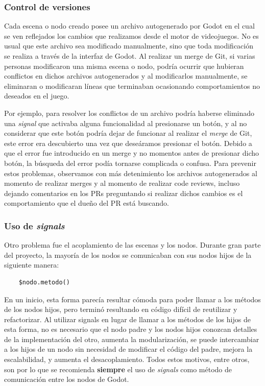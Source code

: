 \subsubsection{Control de versiones}

\noindent Cada escena o nodo creado posee 
un archivo autogenerado por Godot en el cual se ven reflejados los cambios que realizamos desde 
el motor de videojuegos. No es usual que este archivo sea modificado manualmente, sino que toda 
modificación se realiza a través de la interfaz de Godot. Al realizar un merge de Git, si 
varias personas modificaron una misma escena o nodo, podría ocurrir que hubieran conflictos en 
dichos archivos autogenerados y al modificarlos manualmente, se eliminaran o modificaran líneas 
que terminaban ocasionando comportamientos no deseados en el juego.

Por ejemplo, para resolver los conflictos de un archivo podría haberse eliminado una \textit{signal} 
que activaba alguna funcionalidad al presionarse un botón, y al no considerar que este botón 
podría dejar de funcionar al realizar el \textit{merge} de Git, este error era descubierto una 
vez que deseáramos presionar el botón. Debido a que el error fue introducido en un merge y 
no momentos antes de presionar dicho botón, la búsqueda del error podía tornarse complicada 
o confusa. Para prevenir estos problemas, observamos con más detenimiento los archivos 
autogenerados al momento de realizar merges y al momento de realizar code reviews, 
incluso dejando comentarios en los PRs preguntando si realizar dichos cambios 
es el comportamiento que el dueño del PR está buscando.

\subsubsection{Uso de \textit{signals}}

\noindent Otro problema fue el acoplamiento de las escenas y los nodos. Durante gran parte del proyecto, 
la mayoría de los nodos se comunicaban con sus nodos hijos de la siguiente manera:

\begin{lstlisting}
    $nodo.metodo()
\end{lstlisting}

En un inicio, esta forma parecía resultar cómoda para poder llamar a los métodos de los nodos 
hijos, pero terminó resultando en código difícil de reutilizar y refactorizar. 
Al utilizar signals en lugar de llamar a los métodos de los hijos de esta forma, no es necesario 
que el nodo padre y los nodos hijos conozcan detalles de la implementación del otro, aumenta 
la modularización, se puede intercambiar a los hijos de un nodo sin necesidad de modificar el 
código del padre, mejora la escalabilidad, y aumenta el desacoplamiento. Todos estos motivos, entre otros, son por lo que
se recomienda \textbf{siempre} el uso de \textit{signals} como método de comunicación entre los nodos de Godot.

